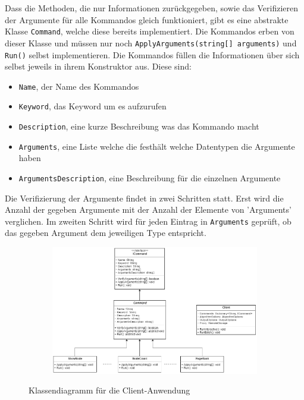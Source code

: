 Dass die Methoden, die nur Informationen zurückgegeben, sowie das Verifizieren der Argumente für alle Kommandos gleich funktioniert, gibt es eine abstrakte Klasse
\verb|Command|, welche diese bereits implementiert. Die Kommandos erben von dieser Klasse und müssen nur noch \verb|ApplyArguments(string[] arguments)| und \verb|Run()| selbst implementieren.
Die Kommandos füllen die Informationen über sich selbst jeweils in ihrem Konstruktor aus. Diese sind:

\begin{itemize}
  \item \verb|Name|, der Name des Kommandos
  \item \verb|Keyword|, das Keyword um es aufzurufen
  \item \verb|Description|, eine kurze Beschreibung was das Kommando macht
  \item \verb|Arguments|, eine Liste welche die festhält welche Datentypen die Argumente haben
  \item \verb|ArgumentsDescription|, eine Beschreibung für die einzelnen Argumente
\end{itemize}

Die Verifizierung der Argumente findet in zwei Schritten statt. Erst wird die Anzahl der gegeben Argumente mit der Anzahl der Elemente von 'Arguments' verglichen.
Im zweiten Schritt wird für jeden Eintrag in \verb|Arguments| geprüft, ob das gegeben Argument dem jeweiligen Type entspricht.


\begin{figure}
  \centering
  \begin{subfigure}[b]{1.0\textwidth}
    \includegraphics[width=1.0\linewidth]{img/client_class.png}
  \end{subfigure}
  \caption{Klassendiagramm für die Client-Anwendung}
  \label{clientClass}
\end{figure}


